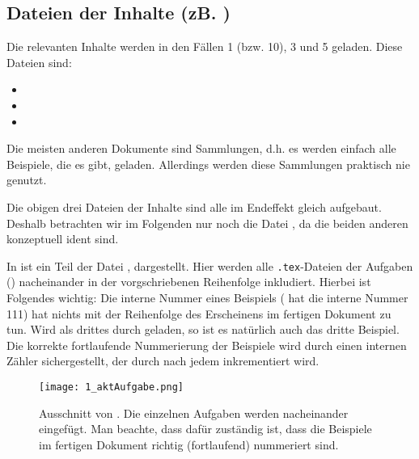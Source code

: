 \subsection{Dateien der Inhalte (zB. )}

Die relevanten Inhalte werden in den Fällen 1 (bzw. 10), 3 und 5 geladen.
Diese Dateien sind:

\begin {itemize}
 \item {}
 \item {}
 \item {}
\end{itemize}

Die meisten anderen Dokumente sind \glqq{}Sammlungen\grqq{}, d.h. es werden
einfach alle Beispiele, die es gibt, geladen. Allerdings werden diese Sammlungen
praktisch nie genutzt.

Die obigen drei Dateien der Inhalte sind alle im Endeffekt gleich aufgebaut. 
Deshalb betrachten wir im Folgenden nur noch die Datei 
, da die beiden anderen konzeptuell ident sind.

In  ist ein Teil der Datei ,
dargestellt. Hier werden alle {\tt .tex}-Dateien der Aufgaben 
() nacheinander in der vorgschriebenen Reihenfolge 
inkludiert. Hierbei ist Folgendes wichtig: Die \glqq{}interne\grqq{} Nummer 
eines Beispiels ( hat die interne Nummer 111) 
hat nichts mit der Reihenfolge des Erscheinens im fertigen Dokument zu tun. 
Wird  als drittes durch 
 geladen, so ist es natürlich auch das dritte 
Beispiel. Die korrekte fortlaufende Nummerierung der Beispiele wird durch einen
internen Zähler sichergestellt, der durch 
nach jedem  inkrementiert wird.

\begin{figure}[htbp]
  \texttt{[image: 1\_aktAufgabe.png]}
  \caption{Ausschnitt von . Die einzelnen
    Aufgaben werden nacheinander eingefügt. Man beachte, dass 
     dafür zuständig ist, dass die Beispiele
    im fertigen Dokument richtig (fortlaufend) nummeriert sind.}
  \label{fig:aktaufgabe}
\end{figure}

